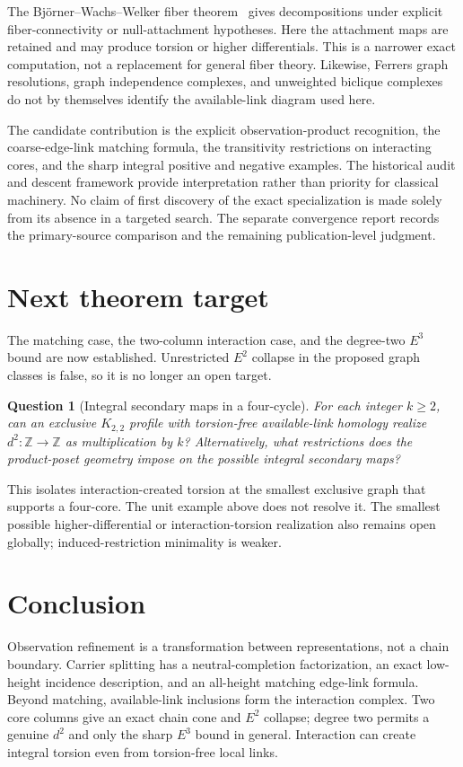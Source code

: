 \documentclass[11pt]{article}
\newtheorem{question}[theorem]{Question}
\begin{document}
The Bj\"orner--Wachs--Welker fiber theorem~\cite{BjornerWachsWelker2005}
gives decompositions under explicit fiber-connectivity or null-attachment
hypotheses.  Here the attachment maps are retained and may produce torsion
or higher differentials.  This is a narrower exact computation, not a
replacement for general fiber theory.  Likewise, Ferrers graph resolutions,
graph independence complexes, and unweighted biclique complexes do not by
themselves identify the available-link diagram used here.

The candidate contribution is the explicit observation-product recognition,
the coarse-edge-link matching formula, the transitivity restrictions on
interacting cores, and the sharp integral positive and negative examples.
The historical audit and descent framework provide interpretation rather
than priority for classical machinery.  No claim of first discovery of the
exact specialization is made solely from its absence in a targeted search.
The separate convergence report records the primary-source comparison and
the remaining publication-level judgment.

\section{Next theorem target}
The matching case, the two-column interaction case, and the degree-two
$E^3$ bound are now established.  Unrestricted $E^2$ collapse in the
proposed graph classes is false, so it is no longer an open target.

\begin{question}[Integral secondary maps in a four-cycle]
For each integer $k\ge2$, can an exclusive $K_{2,2}$ profile with
torsion-free available-link homology realize
$d^2:\mathbb Z\to\mathbb Z$ as multiplication by $k$?
Alternatively, what restrictions does the product-poset geometry impose
on the possible integral secondary maps?
\end{question}
This isolates interaction-created torsion at the smallest exclusive graph
that supports a four-core.  The unit example above does not resolve it.
The smallest possible higher-differential or interaction-torsion realization
also remains open globally; induced-restriction minimality is weaker.

\section{Conclusion}
Observation refinement is a transformation between representations, not a
chain boundary.  Carrier splitting has a neutral-completion factorization,
an exact low-height incidence description, and an all-height matching
edge-link formula.  Beyond matching, available-link inclusions form the
interaction complex.  Two core columns give an exact chain cone and
$E^2$ collapse; degree two permits a genuine $d^2$ and only the sharp
$E^3$ bound in general.  Interaction can create integral torsion even from
torsion-free local links.
\end{document}

